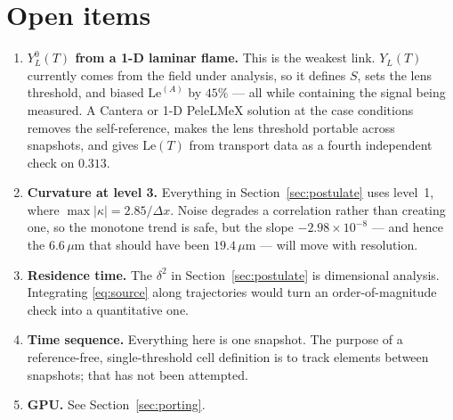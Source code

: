 \documentclass[11pt]{article}
\newcommand{\Le}{\mathrm{Le}}
\begin{document}
\section{Open items}
\label{sec:open}

\begin{enumerate}
\item \textbf{$Y_L^0(T)$ from a 1-D laminar flame.} This is the weakest link.
      $Y_L(T)$ currently comes from the field under analysis, so it defines
      $S$, sets the lens threshold, and biased $\Le^{(A)}$ by $45\%$ --- all
      while containing the signal being measured. A Cantera or 1-D PeleLMeX
      solution at the case conditions removes the self-reference, makes the
      lens threshold portable across snapshots, and gives $\Le(T)$ from
      transport data as a fourth independent check on $0.313$.
\item \textbf{Curvature at level 3.} Everything in
      Section~\ref{sec:postulate} uses level~1, where $\max|\kappa| =
      2.85/\Delta x$. Noise degrades a correlation rather than creating one,
      so the monotone trend is safe, but the slope
      $-2.98\times10^{-8}$ --- and hence the $6.6\,\mu$m that should have been
      $19.4\,\mu$m --- will move with resolution.
\item \textbf{Residence time.} The $\delta^2$ in
      Section~\ref{sec:postulate} is dimensional analysis. Integrating
      \eqref{eq:source} along trajectories would turn an order-of-magnitude
      check into a quantitative one.
\item \textbf{Time sequence.} Everything here is one snapshot. The purpose of
      a reference-free, single-threshold cell definition is to track elements
      between snapshots; that has not been attempted.
\item \textbf{GPU.} See Section~\ref{sec:porting}.
\end{enumerate}
\end{document}
